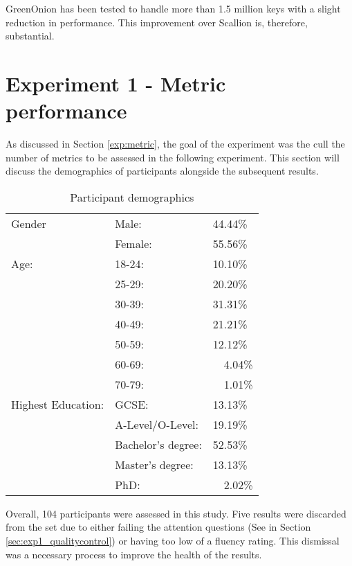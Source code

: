 GreenOnion has been tested to handle more than 1.5 million keys with a slight reduction in performance. This improvement over Scallion is, therefore, substantial.

\section{Experiment 1 - Metric performance}

As discussed in Section \ref{exp:metric}, the goal of the experiment was the cull the number of metrics to be assessed in the following experiment. This section will discuss the demographics of participants alongside the subsequent results.

\begin{table}[h!]
    \centering
    \begin{tabular}{|l|ll|}
        \hline
        Gender & Male: & 44.44\% \\
               & Female: & 55.56\% \\
        \hline
        Age:   & 18-24: & 10.10\% \\
               & 25-29: & 20.20\% \\
               & 30-39: & 31.31\% \\
               & 40-49: & 21.21\% \\
               & 50-59: & 12.12\% \\
               & 60-69: & ~~4.04\% \\ 
               & 70-79: & ~~1.01\% \\ 
               
        \hline
        Highest Education:  
        & GCSE:                 & 13.13\% \\
        & A-Level/O-Level:      & 19.19\% \\
        & Bachelor's degree:    & 52.53\% \\
        & Master's degree:      & 13.13\% \\ 
        & PhD:                  & ~~2.02\%  \\
        \hline

    \end{tabular}
    \caption{Participant demographics}
    \label{tab:exp1_demo}
\end{table}

Overall, 104 participants were assessed in this study. Five results were discarded from the set due to either failing the attention questions (See in Section \ref{sec:exp1_qualitycontrol}) or having too low of a fluency rating. This dismissal was a necessary process to improve the health of the results. 

